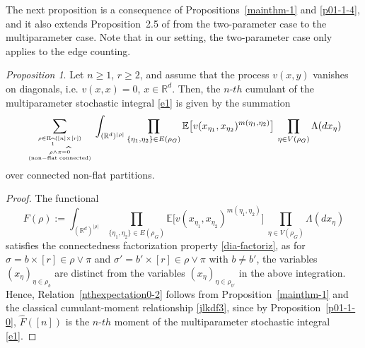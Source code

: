 \documentclass[bj,authoryear,noshowframe]{imsart}
\theoremstyle{plain}
\theoremstyle{remark}
\newcommand{\E}{\mathbb{E}}
\newcommand{\R}{\mathbb{R}}
\def\real{{\mathord{\mathbb R}}}
\newtheorem{prop}{Proposition}[section]
\begin{document}
The next proposition is a consequence of Propositions~\ref{mainthm-1}
and \ref{p01-1-4},
 and it also extends Proposition~2.5 of \cite{jansen}
 from the two-parameter case to the multiparameter
 case. 
 Note that in our setting, the two-parameter case
 only applies to the edge counting. 
\begin{prop}
\label{p01-1} 
Let $n \geq 1$, $r \geq 2$, and assume that the process $v(x,y)$ vanishes
on diagonals, i.e. $v(x,x) = 0$, $x\in \real^d$. 
Then, the $n$-$th$ cumulant of the multiparameter stochastic integral
 \eqref{e1} is given by the summation 
\begin{equation}
  \label{nthexpectation0-2}
  \sum_{\rho \in \Pi_{\widehat{1}} ( [n] \times [r])
    \atop
    {\rho \wedge \pi = \widehat{0}
    \atop {\rm (non-flat \ \! connected)}
    }
    }
    \int_{(\R^d )^{|\rho |}}
      \prod_{\{\eta_1,\eta_2\} \in E(\rho_G)}
  \E \big[ v (x_{\eta_1},x_{\eta_2})^{m({\eta_1,\eta_2})} \big] 
 \ \! \prod_{\eta \in V(\rho_G)}
\Lambda(dx_\eta )
\end{equation}
over connected non-flat partitions.
\end{prop}
\begin{proof}
 The functional 
\begin{equation}
\nonumber %
F(\rho ):=
\int_{(\R^d )^{|\rho |}}
  \prod_{\{\eta_1,\eta_2\} \in E(\rho_G)}
 \E \big[ v(x_{\eta_1},x_{\eta_2})^{m({\eta_1,\eta_2})} \big] 
   \ \! \prod_{\eta \in V(\rho_G)}
\Lambda(dx_\eta )
\end{equation}
 satisfies the connectedness factorization property
 \eqref{dia-factoriz}, as for
 $\sigma = b \times [r] \in \rho \vee \pi$ and
 $\sigma' = b' \times [r] \in \rho \vee \pi$
 with $b \not= b'$, the variables $(x_\eta )_{\eta \in \rho_b}$
 are distinct from the variables $(x_\eta )_{\eta \in \rho_{b'}}$
 in the above integration. 
 Hence, Relation~\eqref{nthexpectation0-2} follows from Proposition~\ref{mainthm-1}
 and the classical cumulant-moment relationship \eqref{jlkdf3},
 since by Proposition~\ref{p01-1-0},
 $\widehat{F}([n])$ is the $n$-$th$ moment of the multiparameter stochastic integral \eqref{e1}. 
\end{proof}
\end{document}
